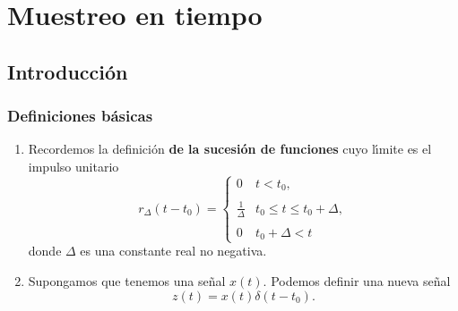 \chapter{Muestreo en tiempo}

\section{Introducci\'{o}n}

\subsection{Definiciones b\'{a}sicas}

\begin{enumerate}
\item   Recordemos la definici\'{o}n \textbf{de la sucesi\'{o}n de funciones} cuyo l\'{\i}mite es el
impulso unitario
\begin{equation}
  r_{\Delta} \left( t - t_{0} \right) = 
  \left \{ \begin{array}{ll}
       0                       &       t < t_{0},                                              \\
  \\
       \frac{1}{\Delta}        &       t_{0} \leq      t       \leq    t_{0} + \Delta,         \\
  \\
       0                       &       t_{0} + \Delta < t 
  \end{array} \right.
\end{equation}
                donde $\Delta$ es una constante real no negativa.

\item   Supongamos que tenemos una se\~{n}al $x \left( t \right)$. Podemos definir una nueva se\~{n}al
\begin{equation}
                        z \left( t \right) = x \left( t \right) \delta \left( t - t_{0}\right).
                \end{equation}
                

\end{enumerate}
